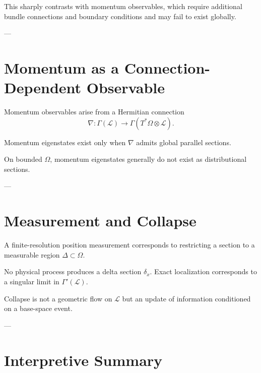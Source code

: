 \documentclass[11pt]{article}
\begin{document}
\begin{remark}
This sharply contrasts with momentum observables, which require additional
bundle connections and boundary conditions and may fail to exist globally.
\end{remark}

---

\section{Momentum as a Connection-Dependent Observable}

\begin{axiom}[Connection]
Momentum observables arise from a Hermitian connection
\[
\nabla : \Gamma(\mathcal L) \to \Gamma(T^*\Omega \otimes \mathcal L).
\]
\end{axiom}

\begin{proposition}
Momentum eigenstates exist only when $\nabla$ admits global parallel sections.
\end{proposition}

\begin{corollary}
On bounded $\Omega$, momentum eigenstates generally do not exist as
distributional sections.
\end{corollary}

---

\section{Measurement and Collapse}

\begin{axiom}
A finite-resolution position measurement corresponds to restricting a section
to a measurable region $\Delta\subset\Omega$.
\end{axiom}

\begin{theorem}
No physical process produces a delta section $\delta_x$.
Exact localization corresponds to a singular limit in $\Gamma'(\mathcal L)$.
\end{theorem}

\begin{remark}
Collapse is not a geometric flow on $\mathcal L$ but an update of information
conditioned on a base-space event.
\end{remark}

---

\section{Interpretive Summary}
\end{document}
